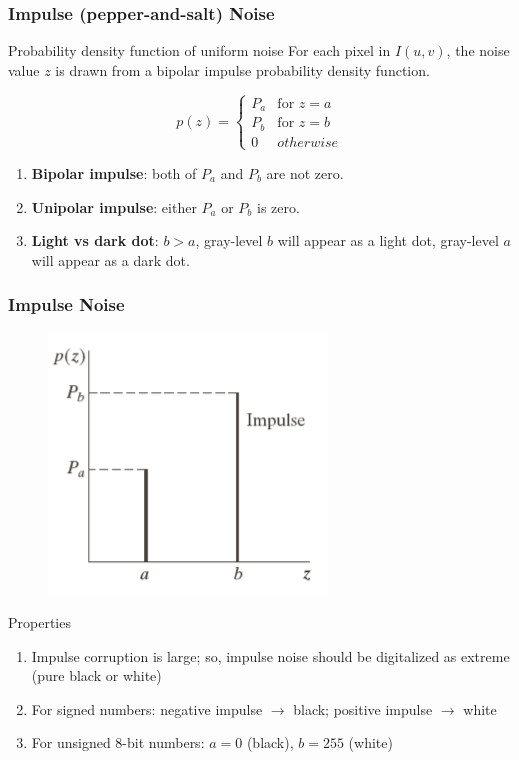 \documentclass[english,11pt,table,handout]{beamer}
\begin{document}
\frame
{
	\frametitle{Impulse (pepper-and-salt) Noise}
	\begin{block}{Probability density function of uniform noise}
		For each pixel in $I(u,v)$, the noise value $z$ is drawn from a bipolar impulse probability density function.
		
		$$
		p(z) =
		\begin{cases}
			P_{a}& \text{for } z = a \\
			P_{b}& \text{for } z = b \\
			0 & otherwise
		\end{cases}
		$$
		
		\begin{enumerate}
			\item \alert{\textbf{Bipolar impulse}}: both of $P_a$ and $P_b$ are not zero.
			\item \alert{\textbf{Unipolar impulse}}: either $P_a$ or $P_b$ is zero.
			\item \alert{\textbf{Light vs dark dot}}: $b > a$, gray-level $b$ will appear as a light dot, gray-level $a$ will appear as a dark dot.
			
		\end{enumerate}
		
	\end{block}
	
}
\frame
{
	\frametitle{Impulse Noise}
	\begin{figure}[!h]
		\includegraphics[scale=0.8]{impulse.png}
	\end{figure}
	
	\begin{alertblock}{Properties}
		\begin{enumerate}
			\item Impulse corruption is large; so, impulse noise should be digitalized as extreme (pure black or white)
			\item For signed numbers: negative impulse $\rightarrow$ black; positive impulse $\rightarrow$ white
			\item For unsigned 8-bit numbers: $a = 0$ (black), $b=255$ (white)
			
		\end{enumerate}
	\end{alertblock}
}
\end{document}
